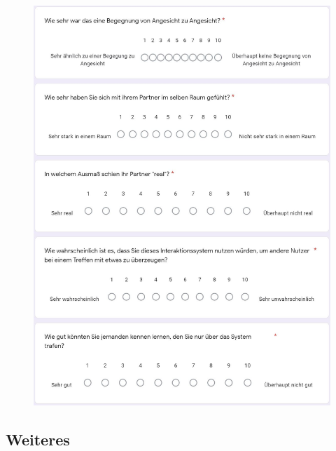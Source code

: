 \documentclass[a4paper,11pt]{article}%
\renewcommand{\\}{\vspace*{0.5\baselineskip} \newline}
\begin{document}
{{	\begin{figure}[H]
	\centering
		\begin{footnotesize}
			\includegraphics[scale=0.6]{Abbildungen/Fragebogen/Post-Questionnaire/PQCP6}
		\end{footnotesize}
	\end{figure}	

\subsection{Weiteres}	
	
}}
\end{document}
